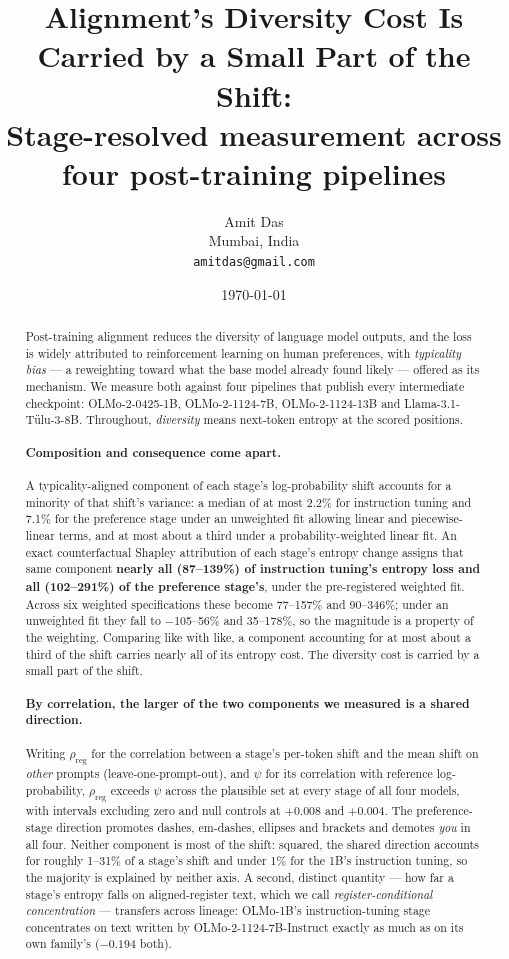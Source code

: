 \documentclass[11pt]{article}
\title{Alignment's Diversity Cost Is Carried by a Small Part of the Shift:\\
\large Stage-resolved measurement across four post-training pipelines}
\author{Amit Das\\
\small Mumbai, India\\
\small \texttt{amitdas@gmail.com}}
\date{\today}
\newcommand{\rreg}{\rho_{\mathrm{reg}}}
\begin{document}
\maketitle

\begin{abstract}
Post-training alignment reduces the diversity of language model outputs, and the
loss is widely attributed to reinforcement learning on human preferences, with
\emph{typicality bias} --- a reweighting toward what the base model already found
likely --- offered as its mechanism. We measure both against four pipelines that
publish every intermediate checkpoint: OLMo-2-0425-1B, OLMo-2-1124-7B,
OLMo-2-1124-13B and Llama-3.1-T\"ulu-3-8B. Throughout, \emph{diversity} means
next-token entropy at the scored positions.

\paragraph{Composition and consequence come apart.} A typicality-aligned component
of each stage's log-probability shift accounts for a minority of that shift's
variance: a median of at most 2.2\% for instruction tuning and 7.1\% for the
preference stage under an unweighted fit allowing linear and piecewise-linear
terms, and at most about a third under a probability-weighted linear fit. An exact
counterfactual Shapley attribution of each stage's entropy change assigns that
same component \textbf{nearly all (87--139\%) of instruction tuning's entropy loss
and all (102--291\%) of the preference stage's}, under the pre-registered weighted
fit. Across six weighted specifications these become 77--157\% and 90--346\%;
under an unweighted fit they fall to $-$105--56\% and 35--178\%, so the magnitude
is a property of the weighting. Comparing like with like, a component accounting for
at most about a third of the shift carries nearly all of its entropy cost. The diversity cost is carried by a
small part of the shift.

\paragraph{By correlation, the larger of the two components we measured is a shared direction.}
Writing $\rreg$ for the
correlation between a stage's per-token shift and the mean shift on \emph{other}
prompts (leave-one-prompt-out), and $\psi$ for its correlation with reference
log-probability, $\rreg$ exceeds $\psi$ across the plausible set at every stage of
all four models, with intervals excluding zero and null controls at $+0.008$ and
$+0.004$. The preference-stage direction promotes dashes, em-dashes, ellipses and
brackets and demotes \emph{you} in all four. Neither component is most of the
shift: squared, the shared direction accounts for roughly 1--31\% of a stage's
shift and under 1\% for the 1B's instruction tuning, so the majority is explained
by neither axis. A second, distinct quantity --- how
far a stage's entropy falls on aligned-register text, which we call
\emph{register-conditional concentration} --- transfers across lineage: OLMo-1B's
instruction-tuning stage concentrates on text written by OLMo-2-1124-7B-Instruct
exactly as much as on its own family's ($-0.194$ both).


\end{abstract}
\end{document}

